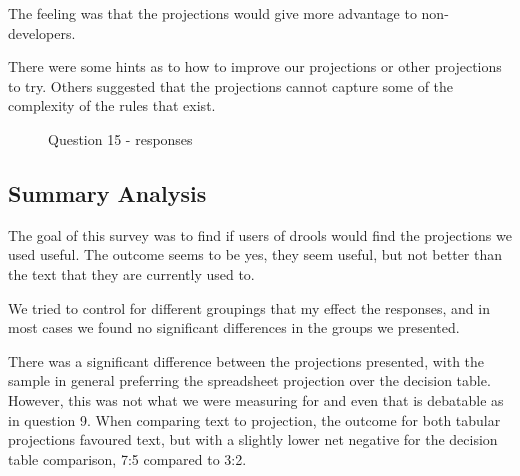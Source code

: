 The feeling was that the projections would give more advantage to non-developers.

There were some hints as to how to improve our projections or other projections to try.
Others suggested that the projections cannot capture some of the complexity of the rules that exist.

\begin{figure}[H]
    \centering
    \caption{Question 15 - responses}
    \label{fig:Q15_wordcloud}
\end{figure}


\subsection{Summary Analysis}

The goal of this survey was to find if users of drools would find the projections we used useful.
The outcome seems to be yes, they seem useful, but not better than the text that they are currently used to.

We tried to control for different groupings that my effect the responses, and in most cases we found no significant differences in the groups we presented.

There was a significant difference between the projections presented, with the sample in general preferring the spreadsheet projection over the decision table. 
However, this was not what we were measuring for and even that is debatable as in question 9.
When comparing text to projection, the outcome for both tabular projections favoured text, but with a slightly lower net negative for the decision table comparison, 7:5 compared to 3:2.
